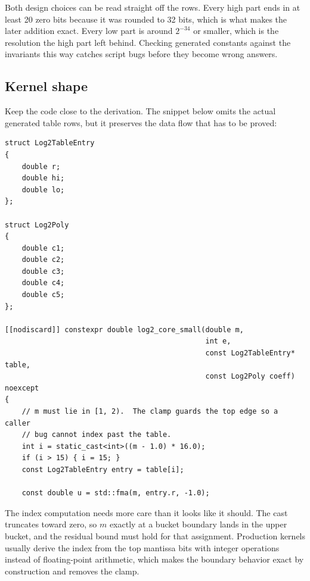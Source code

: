 \documentclass[manuscript, nonacm]{acmart}
\begin{document}
  Both design choices can be read straight off the rows. Every high part
  ends in at least 20 zero bits because it was rounded to 32 bits, which
  is what makes the later addition exact. Every low part is around
  $2^{-34}$ or smaller, which is the resolution the high part left
  behind. Checking generated constants against the invariants this way
  catches script bugs before they become wrong answers.

  \subsection{Kernel shape}

  Keep the code close to the derivation. The snippet below omits the actual
  generated table rows, but it preserves the data flow that has to be proved:

  \begin{lstlisting}[style=cpp]
struct Log2TableEntry
{
    double r;
    double hi;
    double lo;
};

struct Log2Poly
{
    double c1;
    double c2;
    double c3;
    double c4;
    double c5;
};

[[nodiscard]] constexpr double log2_core_small(double m,
                                               int e,
                                               const Log2TableEntry* table,
                                               const Log2Poly coeff) noexcept
{
    // m must lie in [1, 2).  The clamp guards the top edge so a caller
    // bug cannot index past the table.
    int i = static_cast<int>((m - 1.0) * 16.0);
    if (i > 15) { i = 15; }
    const Log2TableEntry entry = table[i];

    const double u = std::fma(m, entry.r, -1.0);
  \end{lstlisting}

  The index computation needs more care than it looks like it should. The
  cast truncates toward zero, so $m$ exactly at a bucket boundary lands in
  the upper bucket, and the residual bound must hold for that assignment.
  Production kernels
  usually derive the index from the top mantissa bits with integer
  operations instead of floating-point arithmetic, which makes the
  boundary behavior exact by construction and removes the clamp.
\end{document}
